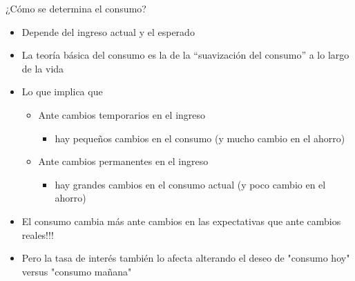 \documentclass{beamer}
\begin{document}
\begin{frame}{¿Cómo se determina el consumo?}
    \begin{itemize}
        \item Depende del ingreso actual y el esperado
        \item La teoría básica del consumo es la de la “suavización del consumo” a lo largo de la vida
        \item Lo que implica que 
            \begin{itemize}
            \item Ante cambios temporarios en el ingreso
                \begin{itemize}
                \item hay pequeños cambios en el consumo (y mucho cambio en el ahorro)
                \end{itemize}            
            \item Ante cambios permanentes en el ingreso
                \begin{itemize}
                \item hay grandes cambios en el consumo actual (y poco cambio en el ahorro)
                \end{itemize}
            \end{itemize}
        \item El consumo cambia más ante cambios en las expectativas que ante cambios reales!!!
        \item Pero la tasa de interés también lo afecta alterando el deseo de "consumo hoy" versus "consumo mañana"
    \end{itemize}
\end{frame}
\end{document}
